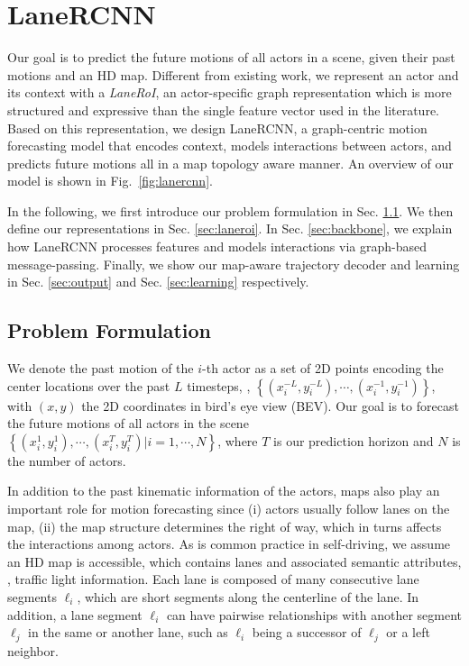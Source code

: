 
\section{LaneRCNN}


Our goal is to  predict the future motions of all actors in a scene, given their
past motions and an HD map. Different from existing work, we represent an actor
and its context with a \textit{LaneRoI}, an actor-specific graph representation which is more
structured and expressive than the single feature vector used in the literature. 
Based
on this representation, we design LaneRCNN, a graph-centric motion forecasting
model that encodes context, models interactions between actors, and predicts future motions all in
a map topology aware manner. An overview of our model is shown in
Fig.~\ref{fig:lanercnn}.

In the following, we first introduce our problem formulation 
in Sec. \ref{sec:notation}. We then define our \ROI representations in Sec.
\ref{sec:laneroi}. In Sec. \ref{sec:backbone}, we explain how LaneRCNN processes features and models interactions via graph-based message-passing. 
Finally, we show our map-aware trajectory decoder and learning
in Sec. \ref{sec:output} and Sec. \ref{sec:learning} respectively.






\subsection{Problem Formulation}
\label{sec:notation}
We denote the  past motion of the $i$-th actor as a set of 2D points encoding
the center locations over the past $L$ 
 timesteps, \ie, $\left\{(x_i^{-L}, y_i^{-L}), \cdots, (x_i^{-1},
y_i^{-1})\right\}$, with $(x,y)$  the  2D coordinates  in bird's eye view (BEV). Our goal is to forecast the future motions of all actors in the scene 
$\left\{(x_i^{1}, y_i^{1}), \cdots, (x_i^{T}, y_i^{T}) | i = 1, \cdots, N\right\}$,
where $T$ is our prediction horizon and $N$ is the number of actors. 

In addition to the past kinematic information of the actors, maps also play an important role 
for motion forecasting since (i) actors usually follow lanes on the map, 
(ii) the map structure determines the right of way, which in turns affects the interactions among actors.
As is common practice in self-driving, we assume an HD map is accessible, 
which contains lanes and associated semantic attributes, \eg,
traffic light information. 
Each lane is composed of
many consecutive lane segments $\ell_i$, which are short segments
along the centerline of the lane.
In addition, a lane segment $\ell_i$ can have pairwise relationships with
another segment $\ell_j$ in the same or another lane, 
such as $\ell_i$ being a successor of $\ell_j$ or a left neighbor.

